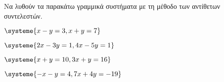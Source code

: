 Να λυθούν τα παρακάτω γραμμικά συστήματα με τη μέθοδο των αντίθετων συντελεστών.
\begin{multicols}{2}
\begin{rlist}[leftmargin=5mm]
\item $ \systeme{x-y=3,x+y=7} $
\item $ \systeme{2x-3y=1,4x-5y=1} $
\item $ \systeme{x+y=10,3x+y=16} $
\item $ \systeme{-x-y=4,7x+4y=-19} $
\end{rlist}
\end{multicols}

